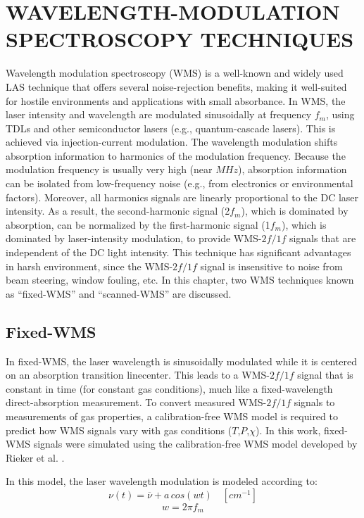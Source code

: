 \chapter{WAVELENGTH-MODULATION SPECTROSCOPY TECHNIQUES}

Wavelength modulation spectroscopy (WMS) is a well-known and widely used LAS technique that offers several noise-rejection benefits, making it well-suited for hostile environments and applications with small absorbance. In WMS, the laser intensity and wavelength are modulated sinusoidally at frequency $f_m$, using TDLs and other semiconductor lasers (e.g., quantum-cascade lasers). This is achieved via injection-current modulation. The wavelength modulation shifts absorption information to harmonics of the modulation frequency. Because the modulation frequency is usually very high (near $MHz$), absorption information can be isolated from low-frequency noise (e.g., from electronics or environmental factors). Moreover, all harmonics signals are linearly proportional to the DC laser intensity. As a result, the second-harmonic signal (2$f_m$), which is dominated by absorption, can be normalized by the first-harmonic signal (1$f_m$), which is dominated by laser-intensity modulation, to provide WMS-$2f/1f$ signals that are independent of the DC light intensity. This technique has significant advantages in harsh environment, since the WMS-$2f/1f$ signal is insensitive to noise from beam steering, window fouling, etc.  In this chapter, two WMS techniques known as 	``fixed-WMS'' and ``scanned-WMS'' are discussed.



 \section{Fixed-WMS}
In fixed-WMS, the laser wavelength is sinusoidally modulated while it is centered on an absorption transition linecenter. This leads to a WMS-$2f/1f$ signal that is constant in time (for constant gas conditions), much like a fixed-wavelength direct-absorption measurement. To convert measured WMS-$2f/1f$ signals to measurements of gas properties, a calibration-free WMS model is required to predict how WMS signals vary with gas conditions ($T$,$P$,$\chi$). In this work, fixed-WMS signals were simulated using the calibration-free WMS model developed by Rieker et al. \cite{rieker2009calibration}. 

In this model, the laser wavelength modulation is modeled according to:
\begin{equation}
\nu(t)=\overline{\nu}+a\,cos(wt) \quad [cm^{-1}]
\end{equation}
\begin{equation}
w=2\pi f_m
\end{equation}

